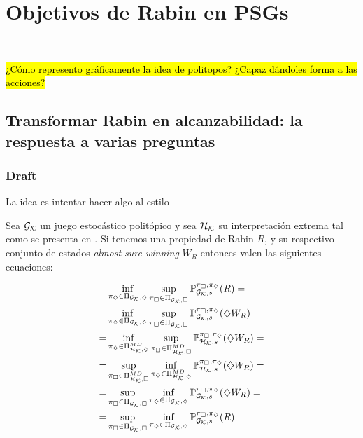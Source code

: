 \chapter{Objetivos de Rabin en PSGs}
~\label{cap:results}





\hl{¿Cómo represento gráficamente la idea de politopos? ¿Capaz dándoles forma a las acciones?}

\section{Transformar Rabin en alcanzabilidad: la respuesta a varias preguntas}

\subsection{Draft}

La idea es intentar hacer algo al estilo

\begin{theorem}
	Sea $\Gk$ un juego estocástico politópico y sea $\Hk$ su interpretación extrema tal como se presenta en \cite{Polytopal}. Si tenemos una propiedad de Rabin $R$, y su respectivo conjunto de estados \textit{almost sure winning} $W_R$ entonces valen las siguientes ecuaciones:

	\begin{align*}
		&\inf_{\piGdiam} \sup_{\piGcuad} \ProbG(R) = \\
		= &\inf_{\piGdiam} \sup_{\piGcuad} \ProbG(\alc W_R) = \\
		= &\inf_{\piHdiamMD} \sup_{\piHcuadMD} \ProbH(\alc W_R) = \\
		= &\sup_{\piHcuadMD} \inf_{\piHdiamMD} \ProbH(\alc W_R) = \\
		= &\sup_{\piGcuad} \inf_{\piGdiam} \ProbG(\alc W_R) = \\
		= &\sup_{\piGcuad} \inf_{\piGdiam} \ProbG(R)
	\end{align*}

\end{theorem}

